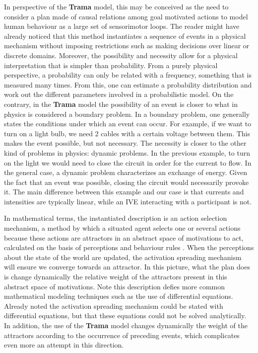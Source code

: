 \documentclass[
		twoside,openright,titlepage,numbers=noenddot,manychapters,
		headinclude,%
                footinclude=false,cleardoublepage=empty,
                BCOR=5mm,
		fontsize=11pt, %
                 enabledeprecatedfontcommands]{scrreprt}
\begin{document}
In perspective of the \textbf{Trama} model, this may be conceived as the need to consider a plan made of causal relations among goal motivated actions to model human behaviour as a large set of sensorimotor loops. The reader might have already noticed that this method instantiates a sequence of events in a physical mechanism without imposing restrictions such as making decisions over linear or discrete domains. Moreover, the possibility and necessity allow for a physical interpretation that is simpler than probability. From a purely physical perspective, a probability can only be related with a frequency, something that is measured many times. From this, one can estimate a probability distribution and work out the different parameters involved in a probabilistic model. On the contrary, in the \textbf{Trama} model the possibility of an event is closer to what in physics is considered a boundary problem. In a boundary problem, one generally states the conditions under which an event can occur. For example, if we want to turn on a light bulb, we need 2 cables with a certain voltage between them. This makes the event possible, but not necessary. The necessity is closer to the other kind of problems in physics: dynamic problems. In the previous example, to turn on the light we would need to close the circuit in order for the current to flow. In the general case, a dynamic problem characterizes an exchange of energy. Given the fact that an event was possible, closing the circuit would necessarily provoke it. The main difference between this example and our case is that currents and intensities are typically linear, while an IVE interacting with a participant is not.

In mathematical terms, the instantiated description is an action selection mechanism, a method by which a situated agent selects one or several actions because these actions are attractors in an abstract space of motivations to act, calculated on the basis of perceptions and behaviour rules \cite[]{goetz1998arb}. When the perceptions about the state of the world are updated, the activation spreading mechanism will ensure we converge towards an attractor. In this picture, what the plan does is change dynamically the relative weight of the attractors present in this abstract space of motivations. Note this description defies more common mathematical modeling techniques such as the use of differential equations. Already \cite{maes1991ana} noted the activation spreading mechanism could be stated with differential equations, but that these equations could not be solved analytically. In addition, the use of the \textbf{Trama} model changes dynamically the weight of the attractors according to the occurrence of preceding events, which complicates even more an attempt in this direction. 
\end{document}
